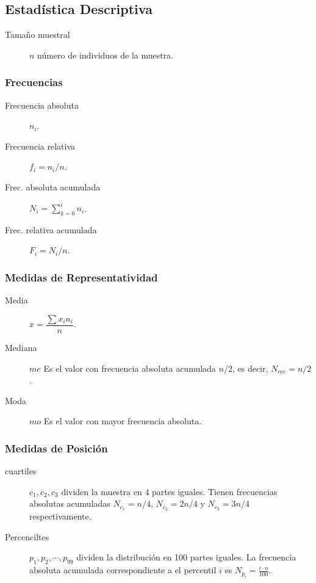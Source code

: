 \documentclass[a4paper,dvips]{article}
\newlength{\mylength}
\newenvironment{marco}{
	\setlength{\fboxsep}{5pt}
	\setlength{\mylength}{\textwidth}
	\addtolength{\mylength}{-2\fboxsep}
	\addtolength{\mylength}{-2\fboxrule}
	\noindent
	\begin{Sbox}
	\begin{minipage}{\mylength}
	\setlength{\abovedisplayskip}{3pt}
	\setlength{\belowdisplayskip}{3pt}
}
{
	\end{minipage}
	\end{Sbox}
	\fbox{\TheSbox}
}
\begin{document}
\sloppy 
{}

\footnotesize
\subsection*{Estadística Descriptiva}

\begin{marco}
\begin{multicols}{2}
\begin{description}
\item [Tamaño muestral] $n$ número de individuos de la muestra.
\end{description}
\subsubsection*{Frecuencias}
\begin{description}
\item [Frecuencia absoluta] $n_i$.
\item [Frecuencia relativa] $f_i=n_i/n$.
\item [Frec. absoluta acumulada] $N_i=\sum_{k=0}^in_i$.
\item [Frec. relativa acumulada] $F_i=N_i/n$.
\end{description}
\subsubsection*{Medidas de Representatividad}
\begin{description}
\item [Media] $\overline{x}=\dfrac{\sum x_in_i}{n}$.
\item [Mediana] $me$ Es el valor con frecuencia absoluta acumulada $n/2$, es
decir, $N_{me}=n/2$.
\item [Moda] $mo$ Es el valor con mayor frecuencia absoluta.
\end{description}
\subsubsection*{Medidas de Posición}
\begin{description}
\item [cuartiles] $c_1,c_2,c_3$ dividen la muestra en 4 partes iguales. Tienen frecuencias absolutas acumuladas
$N_{c_1}=n/4$, $N_{c_2}=2n/4$ y $N_{c_3}=3n/4$ respectivamente.
\item [Percenciltes] $p_1,p_2,\cdots,p_{99}$ dividen la distribución en 100
partes iguales. La frecuencia absoluta acumulada correspondiente a el percentil
$i$ es $N_{p_i}=\frac{i\cdot n}{100}$.
\end{description}

\end{multicols}
\end{marco}
\end{document}
